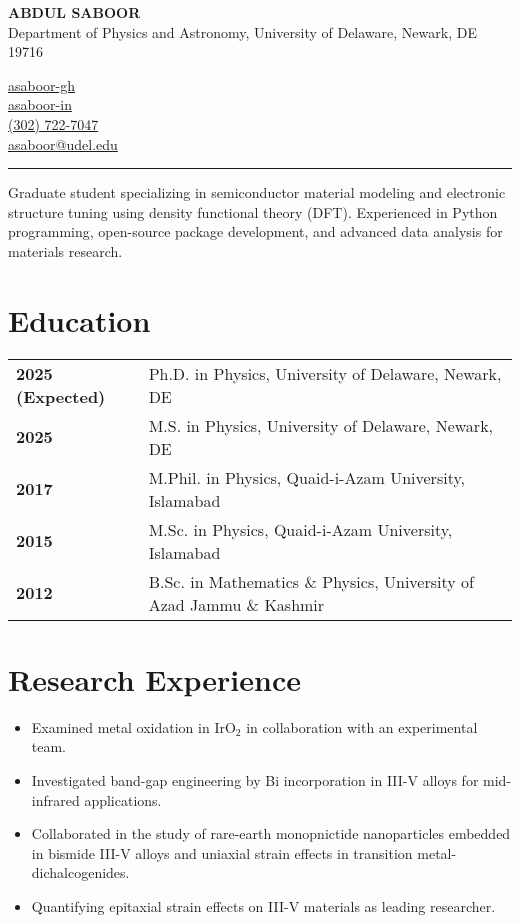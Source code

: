 \documentclass[letter,11pt]{article}
\begin{document}
\begin{minipage}{0.65\textwidth}
    \raggedright
    {\Large \textbf{ABDUL SABOOR}} \\ 
    Department of Physics and Astronomy, University of Delaware, Newark, DE 19716 
\end{minipage}
\hfill
\begin{minipage}{0.3\textwidth}
    \raggedright
    \faGithub \quad \href{https://github.com/asaboor-gh}{asaboor-gh}\\
    \faLinkedin \quad \href{https://linkedin.com/in/asaboor-in}{asaboor-in} \\
    \faPhone \quad \href{tel:+13027227047}{(302) 722-7047} \\
    \faEnvelope \quad \href{mailto:asaboor@udel.edu}{asaboor@udel.edu}
\end{minipage}
\vspace{2mm}
\hrule

\vspace{5mm} \noindent Graduate student specializing in semiconductor material modeling and electronic structure tuning using density functional theory (DFT). Experienced in Python programming, open-source package development, and advanced data analysis for materials research.

\section{Education}
\begin{tabular}{p{3.25cm} p{12cm}}
    \textbf{2025 (Expected)} & Ph.D. in Physics, University of Delaware, Newark, DE \\
    \textbf{2025} & M.S. in Physics, University of Delaware, Newark, DE \\
    \textbf{2017} & M.Phil. in Physics, Quaid-i-Azam University, Islamabad \\
    \textbf{2015} & M.Sc. in Physics, Quaid-i-Azam University, Islamabad \\
    \textbf{2012} & B.Sc. in Mathematics \& Physics, University of Azad Jammu \& Kashmir \\
\end{tabular}

\section{Research Experience}
\begin{itemize}
    \item Examined metal oxidation in IrO$_2$ in collaboration with an experimental team.
    \item Investigated band-gap engineering by Bi incorporation in III-V alloys for mid-infrared applications.
    \item Collaborated in the study of rare-earth monopnictide nanoparticles embedded in bismide III-V alloys and uniaxial strain effects in transition metal-dichalcogenides.
    \item Quantifying epitaxial strain effects on III-V materials as leading researcher.
\end{itemize}
\end{document}
